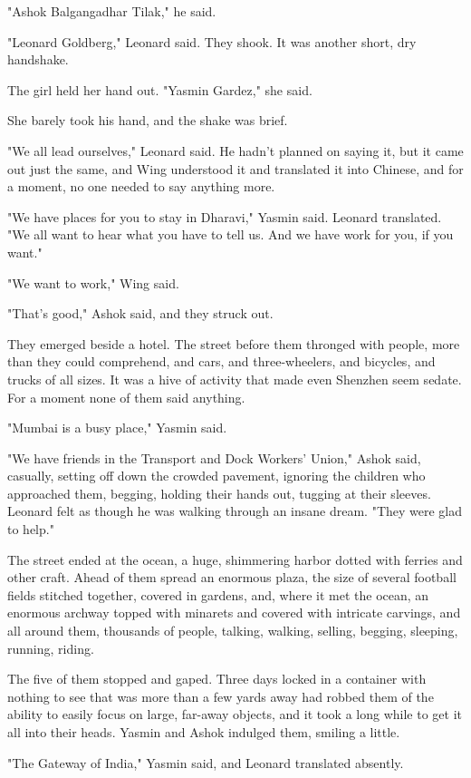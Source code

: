 "Ashok Balgangadhar Tilak," he said.

"Leonard Goldberg," Leonard said. They shook. It was another short,
dry handshake.

The girl held her hand out. "Yasmin Gardez," she said.

She barely took his hand, and the shake was brief.

"We all lead ourselves," Leonard said. He hadn't planned on saying
it, but it came out just the same, and Wing understood it and
translated it into Chinese, and for a moment, no one needed to say
anything more.

"We have places for you to stay in Dharavi," Yasmin said. Leonard
translated. "We all want to hear what you have to tell us. And we
have work for you, if you want."

"We want to work," Wing said.

"That's good," Ashok said, and they struck out.

They emerged beside a hotel. The street before them thronged with
people, more than they could comprehend, and cars, and
three-wheelers, and bicycles, and trucks of all sizes. It was a
hive of activity that made even Shenzhen seem sedate. For a moment
none of them said anything.

"Mumbai is a busy place," Yasmin said.

"We have friends in the Transport and Dock Workers' Union," Ashok
said, casually, setting off down the crowded pavement, ignoring the
children who approached them, begging, holding their hands out,
tugging at their sleeves. Leonard felt as though he was walking
through an insane dream. "They were glad to help."

The street ended at the ocean, a huge, shimmering harbor dotted
with ferries and other craft. Ahead of them spread an enormous
plaza, the size of several football fields stitched together,
covered in gardens, and, where it met the ocean, an enormous
archway topped with minarets and covered with intricate carvings,
and all around them, thousands of people, talking, walking,
selling, begging, sleeping, running, riding.

The five of them stopped and gaped. Three days locked in a
container with nothing to see that was more than a few yards away
had robbed them of the ability to easily focus on large, far-away
objects, and it took a long while to get it all into their heads.
Yasmin and Ashok indulged them, smiling a little.

"The Gateway of India," Yasmin said, and Leonard translated
absently.

